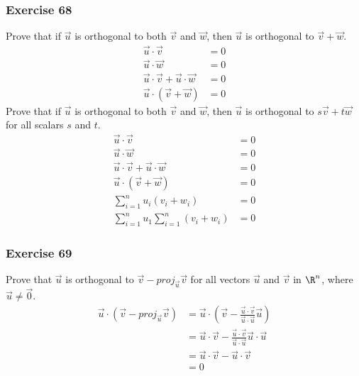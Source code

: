 \documentclass[letterpaper, 12pt]{math}
\begin{document}
\subsubsection*{Exercise 68}
Prove that if \( \vec{u} \) is orthogonal to both \( \vec{v} \) and \( \vec{w}
\), then \( \vec{u} \) is orthogonal to \( \vec{v}+\vec{w} \).
\begin{align*}
  \vec{u}\cdot\vec{v} &= 0 \\
  \vec{u}\cdot\vec{w} &= 0 \\
  \vec{u}\cdot\vec{v}+\vec{u}\cdot\vec{w} &= 0 \\
  \vec{u}\cdot(\vec{v}+\vec{w}) &= 0
\end{align*}
Prove that if \( \vec{u} \) is orthogonal to both \( \vec{v} \) and \( \vec{w}
\), then \( \vec{u} \) is orthogonal to \( s\vec{v}+t\vec{w} \) for all
scalars \( s \) and \( t \).
\begin{align*}
  \vec{u}\cdot\vec{v} &= 0 \\
  \vec{u}\cdot\vec{w} &= 0 \\
  \vec{u}\cdot\vec{v}+\vec{u}\cdot\vec{w} &= 0 \\
  \vec{u}\cdot(\vec{v}+\vec{w}) &= 0 \\
  \sum_{i=1}^{n}u_i(v_i+w_i) &= 0 \\
  \sum_{i=1}^{n}u_1\sum_{i=1}^{n}(v_i+w_i) &= 0
\end{align*}

\subsubsection*{Exercise 69}
Prove that \( \vec{u} \) is orthogonal to \( \vec{v}-proj_{\vec{u}}\vec{v} \)
for all vectors \( \vec{u} \) and \( \vec{v} \) in \( \R^n \), where
\( \vec{u}\ne\vec{0} \).
\begin{align*}
  \vec{u}\cdot(\vec{v}-proj_{\vec{u}}\vec{v}) &= \vec{u}\cdot(\vec{v}-
    \frac{\vec{u}\cdot\vec{v}}{\vec{u}\cdot\vec{u}}\vec{u}) \\
  &= \vec{u}\cdot\vec{v}-
    \frac{\vec{u}\cdot\vec{v}}{\vec{u}\cdot\vec{u}}\vec{u}\cdot\vec{u} \\
  &= \vec{u}\cdot\vec{v}-\vec{u}\cdot\vec{v} \\
  &= 0
\end{align*}
\end{document}
